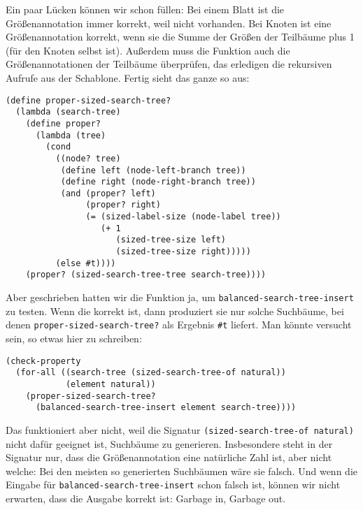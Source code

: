 %
Ein paar Lücken können wir schon füllen: Bei einem Blatt ist die
Größenannotation immer korrekt, weil nicht vorhanden.  Bei Knoten ist
eine Größenannotation korrekt, wenn sie die Summe der Größen der
Teilbäume plus 1 (für den Knoten selbst ist).  Außerdem muss die
Funktion auch die Größenannotationen der Teilbäume überprüfen, das
erledigen die rekursiven Aufrufe aus der Schablone.  Fertig sieht das
ganze so aus:
%
\begin{lstlisting}
(define proper-sized-search-tree?
  (lambda (search-tree)
    (define proper?
      (lambda (tree)
        (cond
          ((node? tree)
           (define left (node-left-branch tree))
           (define right (node-right-branch tree))
           (and (proper? left)
                (proper? right)
                (= (sized-label-size (node-label tree))
                   (+ 1
                      (sized-tree-size left)
                      (sized-tree-size right)))))
          (else #t))))
    (proper? (sized-search-tree-tree search-tree))))
\end{lstlisting}
% 
Aber geschrieben hatten wir die Funktion ja, um
\lstinline{balanced-search-tree-insert} zu testen.  Wenn die korrekt
ist, dann produziert sie nur solche Suchbäume, bei denen
\lstinline{proper-sized-search-tree?} als Ergebnis \lstinline{#t}
liefert.  Man könnte versucht sein, so etwas hier zu schreiben:

\begin{lstlisting}
(check-property
  (for-all ((search-tree (sized-search-tree-of natural))
            (element natural))
    (proper-sized-search-tree?
      (balanced-search-tree-insert element search-tree))))
\end{lstlisting}
%
Das funktioniert aber nicht, weil die Signatur
\lstinline{(sized-search-tree-of natural)} nicht dafür geeignet ist,
Suchbäume zu generieren.  Insbesondere steht in der
Signatur nur, dass die Größenannotation eine natürliche Zahl ist, aber
nicht welche: Bei den meisten so generierten Suchbäumen wäre sie
falsch.  Und wenn die Eingabe für
\lstinline{balanced-search-tree-insert} schon falsch ist, können wir
nicht erwarten, dass die Ausgabe korrekt ist: Garbage in, Garbage out.

